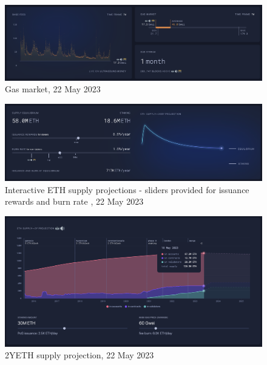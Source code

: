 \documentclass[UTF8]{article}
\begin{document}
\begin{figure}[htbp]
\begin{center}
\includegraphics[width=0.9\linewidth]{images/gasmarket}
\caption{Gas market, 22 May 2023}
\label{fig:gas}
\end{center}
\end{figure}

\begin{figure}[htbp]
\begin{center}
\includegraphics[width=0.9\linewidth]{images/projection}
\caption{Interactive ETH supply projections - sliders provided for issuance rewards and burn rate , 22 May 2023}
\label{fig:projection}
\end{center}
\end{figure}

\begin{figure}[htbp]
\begin{center}
\includegraphics[width=0.9\linewidth]{images/2yprojection}
\caption{2YETH supply projection, 22 May 2023}
\label{fig:2yprojection}
\end{center}
\end{figure}
\end{document}
